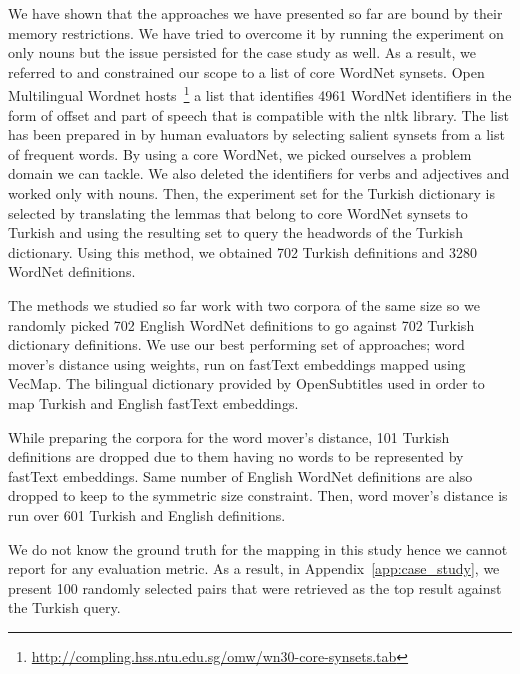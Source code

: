 We have shown that the approaches we have presented so far are bound by their memory restrictions.
We have tried to overcome it by running the experiment on only nouns but the issue persisted for the case study as well.
As a result, we referred to \textcite{khodak_automated_2017} and constrained our scope to a list of core WordNet synsets.
Open Multilingual Wordnet hosts~\footnote{\url{http://compling.hss.ntu.edu.sg/omw/wn30-core-synsets.tab}} a list that identifies 4961 WordNet identifiers in the form of offset and part of speech that is compatible with the nltk library.
The list has been prepared in \textcite{boyd-graber_adding_2006} by human evaluators by selecting salient synsets from a list of frequent words.
By using a core WordNet, we picked ourselves a problem domain we can tackle.
We also deleted the identifiers for verbs and adjectives and worked only with nouns.
Then, the experiment set for the Turkish dictionary is selected by translating the lemmas that belong to core WordNet synsets to Turkish and using the resulting set to query the headwords of the Turkish dictionary.
Using this method, we obtained 702 Turkish definitions and 3280 WordNet definitions.

The methods we studied so far work with two corpora of the same size so we randomly picked 702 English WordNet definitions to go against 702 Turkish dictionary definitions.
We use our best performing set of approaches; word mover's distance using \tfidf{} weights, run on fastText embeddings mapped using VecMap.
The bilingual dictionary provided by OpenSubtitles used in order to map Turkish and English fastText embeddings.

While preparing the corpora for the word mover's distance, 101 Turkish definitions are dropped due to them having no words to be represented by fastText embeddings.
Same number of English WordNet definitions are also dropped to keep to the symmetric size constraint.
Then, word mover's distance is run over 601 Turkish and English definitions.

We do not know the ground truth for the mapping in this study hence we cannot report for any evaluation metric.
As a result, in Appendix~\ref{app:case_study}, we present 100 randomly selected pairs that were retrieved as the top result against the Turkish query.
